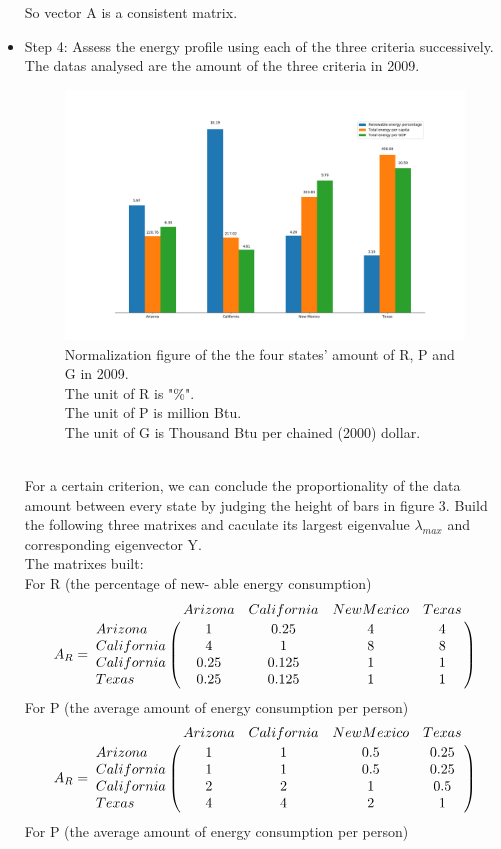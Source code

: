 \documentclass{mcmthesis}
\begin{document}
\begin{itemize}
  	So vector A is a consistent matrix.
  	\item Step 4: Assess the energy profile using each of the three criteria successively. The datas analysed are the amount of the three criteria in 2009.
  	\begin{figure}[!h]
    \centering
    \includegraphics[width=\textwidth]{figures//AHP.png}
    \caption{Normalization figure of the the four states' amount of R, P and G in 2009.
    \\ The unit of R is "\%".
    \\The unit of P is million Btu.
    \\ The unit of G is Thousand Btu per chained (2000) dollar.}
    \end{figure}\\
    For a certain criterion, we can conclude the proportionality of the data amount between every state by judging the height of bars in figure 3.
    Build the following three matrixes and caculate its largest eigenvalue $\lambda_{max}$ and corresponding eigenvector Y.\\
    The matrixes built:\\
    For R (the percentage of new- able energy consumption) 
    			$$
				A_R = \bordermatrix{
					& Arizona & California & New Mexico & Texas  \cr
				Arizona &   1 & 0.25 & 4 & 4\cr
				California &   4 & 1 & 8 & 8\cr
				California & 0.25  & 0.125 & 1 & 1\cr
				Texas & 0.25 & 0.125 & 1 & 1
					}
				$$
	For P (the average amount of energy consumption per person) 
    			$$
				A_R = \bordermatrix{
					& Arizona & California & New Mexico & Texas  \cr
				Arizona &   1 & 1 & 0.5 & 0.25\cr
				California &   1 & 1 & 0.5 & 0.25\cr
				California & 2  & 2 & 1 & 0.5\cr
				Texas & 4 & 4 & 2 & 1
					}
				$$
	For P (the average amount of energy consumption per person) 

\end{itemize}
\end{document}
